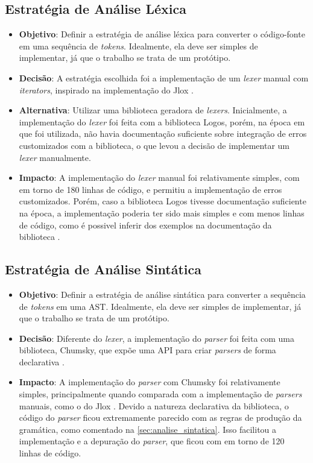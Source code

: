 \subsection{Estratégia de Análise Léxica}

\begin{itemize}
	\item \textbf{Objetivo}: Definir a estratégia de análise léxica para converter o código-fonte em uma sequência de \textit{tokens}. Idealmente, ela deve ser simples de implementar, já que o trabalho se trata de um protótipo.
	\item \textbf{Decisão}: A estratégia escolhida foi a implementação de um \textit{lexer} manual com \textit{iterators}, inspirado na implementação do Jlox \cite{craftinginterpreters}.
	\item \textbf{Alternativa}: Utilizar uma biblioteca geradora de \textit{lexers}. Inicialmente, a implementação do \textit{lexer} foi feita com a biblioteca Logos, porém, na época em que foi utilizada, não havia documentação suficiente sobre integração de erros customizados com a biblioteca, o que levou a decisão de implementar um \textit{lexer} manualmente.
	\item \textbf{Impacto}: A implementação do \textit{lexer} manual foi relativamente simples, com em torno de 180 linhas de código, e permitiu a implementação de erros customizados. Porém, caso a biblioteca Logos tivesse documentação suficiente na época, a implementação poderia ter sido mais simples e com menos linhas de código, como é possivel inferir dos exemplos na documentação da biblioteca \cite{logos}.
\end{itemize}

\subsection{Estratégia de Análise Sintática}

\begin{itemize}
	\item \textbf{Objetivo}: Definir a estratégia de análise sintática para converter a sequência de \textit{tokens} em uma AST. Idealmente, ela deve ser simples de implementar, já que o trabalho se trata de um protótipo.
	\item \textbf{Decisão}: Diferente do \textit{lexer}, a implementação do \textit{parser} foi feita com uma biblioteca, Chumsky, que expõe uma API para criar \textit{parsers} de forma declarativa \cite{chumsky}.
	\item \textbf{Impacto}: A implementação do \textit{parser} com Chumsky foi relativamente simples, principalmente quando comparada com a implementação de \textit{parsers} manuais, como o do Jlox \cite{craftinginterpreters}. Devido a natureza declarativa da biblioteca, o código do \textit{parser} ficou extremamente parecido com as regras de produção da gramática, como comentado na \autoref{sec:analise_sintatica}. Isso facilitou a implementação e a depuração do \textit{parser}, que ficou com em torno de 120 linhas de código.
\end{itemize}


